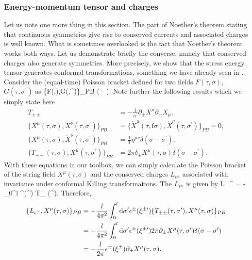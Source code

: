 \subsubsection{Energy-momentum tensor and charges}
Let us note one more thing in this section.
The part of Noether's theorem stating that continuous symmetries give rise to conserved currents and associated charges is well known. What is sometimes overlooked is the fact that Noether's theorem works both ways. Let us demonstrate briefly the converse, namely that conserved charges also generate symmetries. More precisely, we show that the stress energy tensor generates conformal transformations, something we have already seen in . Consider the (equal-time) Poisson bracket defined for two fields $F(\tau,\sigma)$, $G(\tau,\sigma^\prime)$ as
\bse 
\{F(\tau,\sigma),G(\tau,\sigma^\prime)\}_{PB} \equiv \int \md \tilde{\sigma} \left(  -   \right).
\ese 
Note further the following results which we simply state here
\begin{align*}
	T_{\pm \pm} &= -\frac{1}{\alpha^\prime} \partial_\pm X^\mu \partial_\pm X_\mu, \\
	\{X^\mu(\tau,\sigma),X^\nu(\tau,\sigma^\prime) \}_{PB} &= \{\dot{X}^\mu(\tau,ſ\sigma),\dot{X}^\nu(\tau,\sigma^\prime) \}_{PB} = 0,\\
	\{X^\mu(\tau,\sigma),\dot{X}^\nu(\tau,\sigma^\prime) \}_{PB} &= \frac{1}{T} \eta^{\mu \nu} \delta(\sigma-\sigma^\prime),\\
	\{T_{\pm \pm}(\tau,\sigma),X^\mu(\tau,\sigma^\prime) \}_{PB} &=  2\pi \delta_\pm X^\mu (\tau,\sigma) \delta(\sigma-\sigma^\prime).
\end{align*}
With these equations in our toolbox, we can simply calculate the Poisson bracket of the string field $X^\mu(\tau,\sigma)$ and the conserved charges $L_{\epsilon^\pm}$ associated with invariance under conformal Killing transformations. The $L_{\epsilon^\pm}$ is given by 
\be 
L_{\epsilon^\pm} = -  \int_0^l \md \sigma \epsilon^\pm (\xi^\pm) T_{\pm \pm} (\xi^\pm). 
\ee 
Therefore,
\begin{align*}
	\{L_{\epsilon^\pm}, X^\mu(\tau,\sigma) \}_{PB} &= - \frac{l}{4 \pi^2} \int_0^l \mathrm{d} \sigma^\prime \epsilon^\pm(\xi^{\pm \prime}) \{T_{\pm \pm} (\tau,\sigma^\prime),X^\mu(\tau,\sigma) \}_{PB} \\
	&= - \frac{l}{4 \pi^2} \int_0^l \mathrm{d} \sigma^\prime \epsilon^\pm(\xi^{\pm \prime}) 2 \pi \partial_\pm X^\mu(\tau,\sigma^\prime) \delta(\sigma-\sigma^\prime) \\
	&=-\frac{l}{2 \pi} \epsilon^\pm(\xi^\pm) \partial_\pm X^\mu(\tau,\sigma).
\end{align*}
